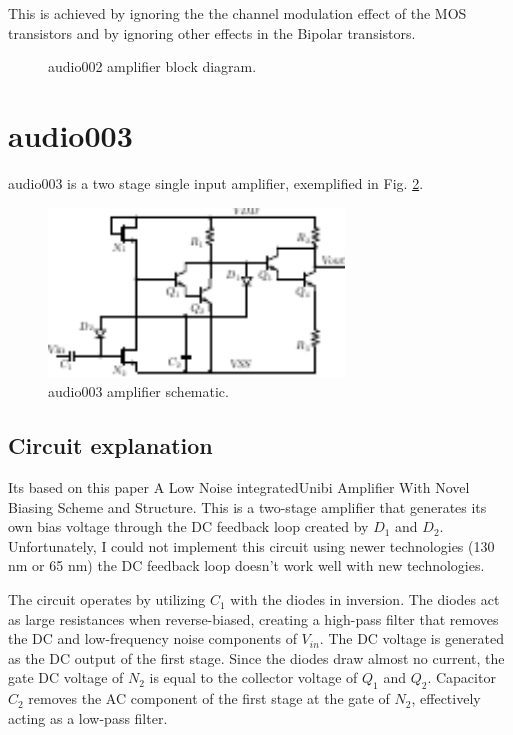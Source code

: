 \documentclass[12pt]{article}
\begin{document}
This is achieved by ignoring the the channel modulation effect of the MOS transistors and by ignoring other effects in the Bipolar transistors.



\begin{figure}[H]
        \centering
        
        \caption{audio002 amplifier block diagram.}
        \label{audio002_diag}
\end{figure}



\newpage



\section{audio003}

audio003 is a  two stage single input amplifier, exemplified in Fig. \ref{audio003}.
\begin{figure}[H]
        \centering
        \includegraphics[width=0.7\textwidth]{audio003.pdf}
        \caption{audio003 amplifier schematic.}
        \label{audio003}
\end{figure}

\subsection{Circuit explanation}
Its based on this paper A Low Noise integratedUnibi Amplifier With Novel Biasing Scheme and Structure.
This is a two-stage amplifier that generates its own bias voltage through the DC feedback loop created by $D_1$ and $D_2$. Unfortunately, I could not implement this circuit using newer technologies (130 nm or 65 nm) the DC feedback loop doesn't work well with new technologies.  

The circuit operates by utilizing $C_1$ with the diodes in inversion. The diodes act as large resistances when reverse-biased, creating a high-pass filter that removes the DC and low-frequency noise components of $V_{in}$. The DC voltage is generated as the DC output of the first stage. Since the diodes draw almost no current, the gate DC voltage of $N_2$ is equal to the collector voltage of $Q_1$ and $Q_2$. Capacitor $C_2$ removes the AC component of the first stage at the gate of $N_2$, effectively acting as a low-pass filter.  
\end{document}
